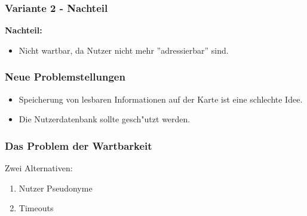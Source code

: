 \begin{frame}
	\frametitle{Variante 2 - Nachteil}
	\textbf<2->{Nachteil:}
	\begin{itemize}
		\item<2-> Nicht wartbar, da Nutzer nicht mehr ''adressierbar'' sind.
	\end{itemize}
\end{frame}

\begin{frame}
	\frametitle {Neue Problemstellungen}
	\begin{itemize}
		\item<2-> Speicherung von lesbaren Informationen auf der
		Karte ist eine schlechte Idee.
		\item<3-> Die Nutzerdatenbank sollte gesch"utzt werden.
	\end{itemize}
\end{frame}

\begin{frame}
	\frametitle{Das Problem der Wartbarkeit}
	Zwei Alternativen:
	\begin{enumerate}
		\item<2-> Nutzer Pseudonyme
		\item<3-> Timeouts
	\end{enumerate}
\end{frame}
